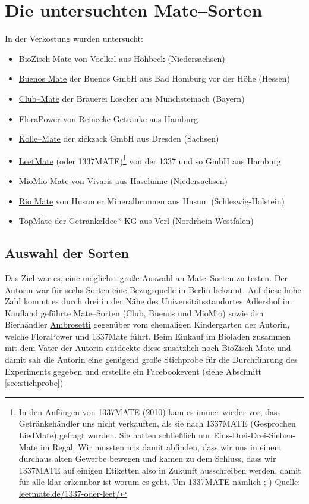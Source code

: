 \documentclass[11pt,a4paper,ngerman]{article}
\begin{document}
\section{Die untersuchten Mate--Sorten}
In der Verkostung wurden untersucht:
\begin{itemize}
 \item \href{http://www.voelkeljuice.de/sortiment/title/biozisch-mate/}{BioZisch Mate} von Voelkel aus Höhbeck (Niedersachsen)
 \item \href{http://www.buenos-icetea.com/buenos-mate/}{Buenos Mate} der Buenos GmbH aus Bad Homburg vor der Höhe (Hessen)
 \item \href{http://www.clubmate.de/}{Club--Mate} der Brauerei Loscher aus Münchsteinach (Bayern)
 \item \href{http://www.flora-power.de/}{FloraPower} von Reinecke Getränke aus Hamburg
 \item \href{http://kolle-mate.de/http://kolle-mate.de/}{Kolle--Mate} der zickzack GmbH aus Dresden (Sachsen)
 \item \href{http://leetmate.de/}{LeetMate} (oder 1337MATE)\footnote{In den Anfängen von 1337MATE (2010) kam es immer wieder vor, dass Getränkehändler uns nicht verkauften, als sie nach 1337MATE (Gesprochen LiedMate) gefragt wurden. Sie hatten schließlich nur Eins-Drei-Drei-Sieben-Mate im Regal.
Wir mussten uns damit abfinden, dass wir uns in einem durchaus alten Gewerbe bewegen und kamen zu dem Schluss, dass wir 1337MATE auf einigen Etiketten also in Zukunft ausschreiben werden, damit für alle klar erkennbar ist worum es geht. Um 1337MATE nämlich ;-) Quelle: \href{http://leetmate.de/1337-oder-leet/}{leetmate.de/1337-oder-leet/} }  von der 1337 und so GmbH aus Hamburg
 \item \href{http://www.vivaris.net/#c17}{MioMio Mate} von Vivaris aus Haselünne (Niedersachsen)
 \item \href{http://www.husumer-mineralbrunnen.de/produkte/rio-mate/}{Rio Mate} von Husumer Mineralbrunnen aus Husum  (Schleswig-Holstein)
 \item \href{http://www.top-mate.de/}{TopMate} der GetränkeIdee* KG aus Verl (Nordrhein-Westfalen)
\end{itemize}

\subsection{Auswahl der Sorten}
Das Ziel war es, eine möglichst große Auswahl an Mate--Sorten zu testen. Der Autorin war für sechs Sorten eine Bezugsquelle in Berlin bekannt. Auf diese hohe Zahl kommt es durch drei in der Nähe des Universitätsstandortes Adlershof im Kaufland geführte Mate--Sorten (Club, Buenos und MioMio) sowie den Bierhändler \href{http://www.ambrosetti.de/}{Ambrosetti} gegenüber vom ehemaligen Kindergarten der Autorin, welche FloraPower und 1337Mate führt. Beim Einkauf im Bioladen zusammen mit dem Vater der Autorin entdeckte diese zusätzlich noch BioZisch Mate und damit sah die Autorin eine genügend große Stichprobe für die Durchführung des Experiments gegeben und erstellte ein Facebookevent (siehe Abschnitt \ref{sec:stichprobe})
\end{document}
